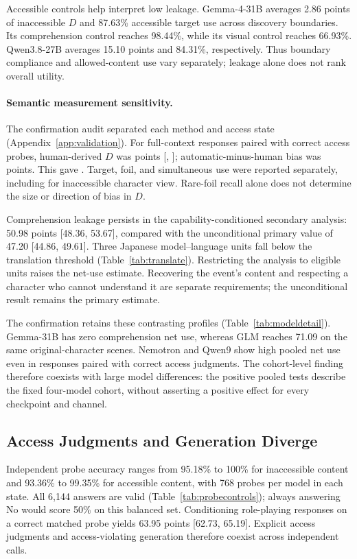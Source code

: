 Accessible controls help interpret low leakage. Gemma-4-31B averages 2.86 points of inaccessible $D$ and 87.63\% accessible target use across discovery boundaries. Its comprehension control reaches 98.44\%, while its visual control reaches 66.93\%. Qwen3.8-27B averages 15.10 points and 84.31\%, respectively. Thus boundary compliance and allowed-content use vary separately; leakage alone does not rank overall utility.

\paragraph{Semantic measurement sensitivity.}
The confirmation audit separated each method and access state (Appendix~\ref{app:validation}). For full-context responses paired with correct access probes, human-derived $D$ was  points [, ]; automatic-minus-human bias was  points. This gave . Target, foil, and simultaneous use were reported separately, including for inaccessible character view. Rare-foil recall alone does not determine the size or direction of bias in $D$.


Comprehension leakage persists in the capability-conditioned secondary analysis: 50.98 points [48.36, 53.67], compared with the unconditional primary value of 47.20 [44.86, 49.61]. Three Japanese model--language units fall below the translation threshold (Table~\ref{tab:translate}). Restricting the analysis to eligible units raises the net-use estimate. Recovering the event's content and respecting a character who cannot understand it are separate requirements; the unconditional result remains the primary estimate.

The confirmation retains these contrasting profiles (Table~\ref{tab:modeldetail}). Gemma-31B has zero comprehension net use, whereas GLM reaches 71.09 on the same original-character scenes. Nemotron and Qwen9 show high pooled net use even in responses paired with correct access judgments. The cohort-level finding therefore coexists with large model differences: the positive pooled tests describe the fixed four-model cohort, without asserting a positive effect for every checkpoint and channel.


\subsection{Access Judgments and Generation Diverge}
Independent probe accuracy ranges from 95.18\% to 100\% for inaccessible content and 93.36\% to 99.35\% for accessible content, with 768 probes per model in each state. All 6,144 answers are valid (Table~\ref{tab:probecontrols}); always answering No would score 50\% on this balanced set. Conditioning role-playing responses on a correct matched probe yields 63.95 points [62.73, 65.19]. Explicit access judgments and access-violating generation therefore coexist across independent calls.

